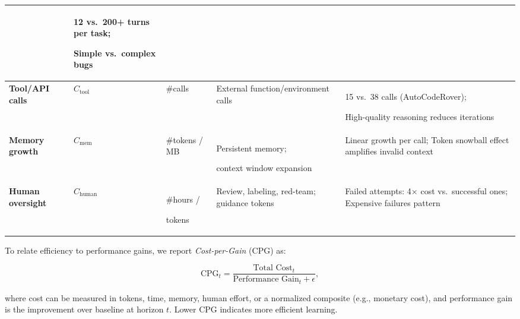 \documentclass[10pt]{article} %
\begin{document}
\begin{table}[t!]
{\begin{tabular}{m{2.5cm}m{1.4cm}m{2cm}m{4.8cm}m{6.8cm}}
& 12 vs.\ 200+ turns per task; 

Simple vs.\ complex bugs\\

\midrule

\cellcolor[rgb]{0.96,0.96,0.96}\textbf{Tool/API calls} 

& \cellcolor[rgb]{0.96,0.96,0.96}$C_{\text{tool}}$ 

& \cellcolor[rgb]{0.96,0.96,0.96}\#calls 

& \cellcolor[rgb]{0.96,0.96,0.96}External function/environment calls 

& \cellcolor[rgb]{0.96,0.96,0.96}15 vs.\ 38 calls (AutoCodeRover); 

High-quality reasoning reduces iterations \\

\midrule

\textbf{Memory growth} 

& $C_{\text{mem}}$ 

& \#tokens / MB 

& Persistent memory;

context window expansion 

& Linear growth per call; Token snowball effect amplifies invalid context \\

\midrule

\cellcolor[rgb]{0.96,0.96,0.96}\textbf{Human oversight} 

& \cellcolor[rgb]{0.96,0.96,0.96}$C_{\text{human}}$ 

& \cellcolor[rgb]{0.96,0.96,0.96} \#hours / 

tokens 

& \cellcolor[rgb]{0.96,0.96,0.96}Review, labeling, red-team; guidance tokens 

& \cellcolor[rgb]{0.96,0.96,0.96}Failed attempts: 4× cost vs.\ successful ones; Expensive failures pattern \\

\bottomrule

\end{tabular}}

\end{table}

To relate efficiency to performance gains, we report \emph{Cost-per-Gain} (CPG) as:

\[
\mathrm{CPG}_t = \frac{\text{Total Cost}_t}{\text{Performance Gain}_t + \epsilon},
\]

where cost can be measured in tokens, time, memory, human effort, or a normalized composite (e.g., monetary cost), and performance gain is the improvement over baseline at horizon $t$. Lower CPG indicates more efficient learning.
\end{document}

